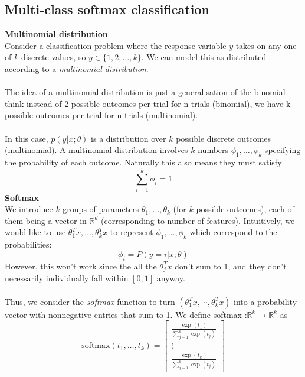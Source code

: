 \documentclass{report}
\begin{document}
\subsection{Multi-class softmax classification}
\textbf{Multinomial distribution}\\
Consider a classification problem where the response variable $y$ takes on any one of $k$ discrete values, so
$y\in\{1,2,\ldots,k\}$. We can model this as distributed according to a \textit{multinomial distribution}.\\
\vspace{1mm}\\
The idea of a multinomial distribution is just a generalisation of the binomial---think instead of 
2 possible outcomes per trial for n trials (binomial), we have k possible outcomes per trial for n trials (multinomial).\\
\vspace{1mm}\\
In this case, $p(y|x;\theta)$ is a distribution over $k$ possible discrete outcomes (multinomial). 
A multinomial distribution involves $k$ numbers $\phi_1,\ldots,\phi_k$ specifying
the probability of each outcome. Naturally this also means they must satisfy
\begin{equation*}
\sum^k_{i=1}\phi_i=1
\end{equation*}
\textbf{Softmax}\\
We introduce $k$ groups of parameters $\theta_1,\ldots,\theta_k$ (for $k$ possible outcomes), each of them being a
vector in $\mathbb{R}^d$ (corresponding to number of features). Intuitively, we would like to use
$\theta_1^Tx,\ldots,\theta_k^Tx$ to represent $\phi_1,\ldots,\phi_k$ which correspond to the probabilities:
\begin{equation*}
\phi_i=P(y=i|x;\theta)
\end{equation*}
However, this won't work since the all the $\theta_j^Tx$ don't sum to 1, and they don't necessarily individually
fall within $[0,1]$ anyway.\\
\vspace{1mm}\\
Thus, we consider the \textit{softmax} function to turn $(\theta_1^Tx,\cdots,\theta_k^Tx)$ into a probability 
vector with nonnegative entries that sum to 1. We define
softmax :$\mathbb{R}^k\to\mathbb{R}^k$ as
\begin{equation*}
\text{softmax}(t_1,\ldots,t_k)=\begin{bmatrix}
\frac{\exp(t_1)}{\sum^k_{j=1}\exp(t_j)}\\\vdots\\
\frac{\exp(t_k)}{\sum^k_{j=1}\exp(t_j)}\end{bmatrix}
\end{equation*}
\end{document}
